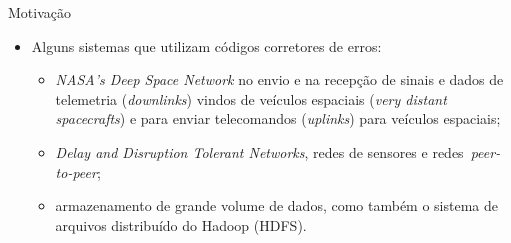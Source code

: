   \begin{frame}{Motivação}
     \begin{itemize}
      \item Alguns sistemas que utilizam códigos corretores de erros:
	\begin{itemize}
            \item \emph{NASA's Deep Space Network} no envio e na recepção de sinais e dados de telemetria
(\emph{downlinks}) vindos de veículos espaciais (\emph{very distant spacecrafts}) e para enviar telecomandos (\emph{uplinks}) para
veículos espaciais;
           \item \emph{Delay and Disruption Tolerant Networks}, redes de sensores e redes~\emph{peer-to-peer};
           \item armazenamento de grande volume de dados, como também o sistema de arquivos distribuído do Hadoop (HDFS).
	\end{itemize}
     \end{itemize}
  \end{frame}



